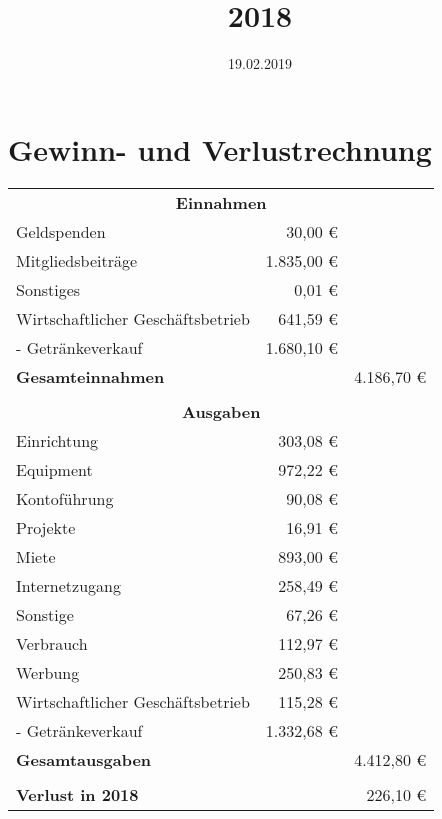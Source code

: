 \documentclass{scrartcl}%
\begin{document}
\subject{Finanzbericht}%
\title{2018}%
\subtitle{}%
\author{}%
\date{19.02.2019}%
\publishers{vspace.one e.V.}%
\maketitle%
\tableofcontents
\section{Gewinn- und Verlustrechnung}

\begin{tabular}{|l r r|}
\hline
\multicolumn{3}{|c|}{\textbf{Einnahmen}} \\
Geldspenden                         & 30,00 €	    & \\
Mitgliedsbeiträge                   & 1.835,00 €	& \\
Sonstiges                           & 0,01 €	    & \\
Wirtschaftlicher Geschäftsbetrieb	& 641,59 €	    & \\
- Getränkeverkauf	                & 1.680,10 €	& \\
\textbf{Gesamteinnahmen}            &               & 4.186,70 €   \\
&&\\	
\multicolumn{3}{|c|}{\textbf{Ausgaben}} \\		
Einrichtung	                        & 303,08 €	    & \\
Equipment	                        & 972,22 €	    & \\
Kontoführung	                    & 90,08 €	    & \\
Projekte	                        & 16,91 €	    & \\
Miete	                            & 893,00 €      & \\
Internetzugang	                    & 258,49 €	    & \\
Sonstige                            & 67,26 €	    & \\
Verbrauch	                        & 112,97 €	    & \\
Werbung	                            & 250,83 €	    & \\
Wirtschaftlicher Geschäftsbetrieb	& 115,28 €	    & \\
- Getränkeverkauf	                & 1.332,68 €	& \\
\textbf{Gesamtausgaben}             &               & 4.412,80 € \\
&&\\
\textbf{Verlust in 2018}            &               & 226,10 € \\
\hline
\end{tabular}
\end{document}
